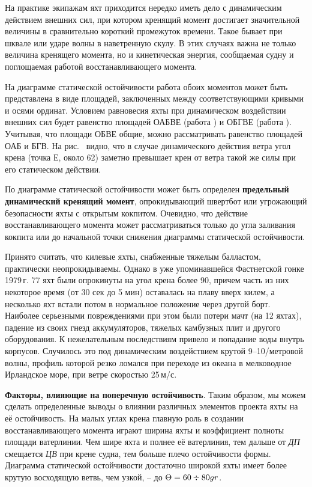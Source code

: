 На практике экипажам яхт приходится нередко иметь дело с динамическим действием внешних сил, при котором кренящий момент достигает значительной величины в сравнительно короткий промежуток времени. Такое бывает при шквале или ударе волны в наветренную скулу. В этих случаях важна не только величина кренящего момента, но и кинетическая энергия, сообщаемая судну и поглощаемая работой восстанавливающего момента. 

На диаграмме статической остойчивости работа обоих моментов может быть представлена в виде площадей, заключенных между соответствующими кривыми и осями ординат. Условием равновесия яхты при динамическом воздействии внешних сил будет равенство площадей ОАБВЕ (работа ) и ОБГВЕ (работа ). Учитывая, что площади ОБВЕ общие, можно рассматривать равенство площадей ОАБ и БГВ. На рис.~ видно, что в случае динамического действия ветра угол крена (точка Е, около 62\gr) заметно превышает крен от ветра такой же силы при его статическом действии. 

По диаграмме статической остойчивости может быть определен \textbf{предельный динамический кренящий момент}, опрокидывающий швертбот или угрожающий безопасности яхты с открытым кокпитом. Очевидно, что действие восстанавливающего момента может рассматриваться только до угла заливания кокпита или до начальной точки снижения диаграммы статической остойчивости.

Принято считать, что килевые яхты, снабженные тяжелым балластом, практически неопрокидываемы. Однако в уже упоминавшейся Фастнетской гонке 1979\,г. 77 яхт были опрокинуты на угол крена более 90\gr, причем часть из них некоторое время (от 30 сек до 5 мин) оставалась на плаву вверх килем, а несколько яхт встали потом в нормальное положение через другой борт. Наиболее серьезными повреждениями при этом были потери мачт (на 12 яхтах), падение из своих гнезд аккумуляторов, тяжелых камбузных плит и другого оборудования. К нежелательным последствиям привело и попадание воды внутрь корпусов. Случилось это под динамическим воздействием крутой 9--10\-/метровой волны, профиль которой резко ломался при переходе из океана в мелководное Ирландское море, при ветре скоростью 25\,м/с.

\textbf{Факторы, влияющие на поперечную остойчивость}. Таким образом, мы можем сделать определенные выводы о влиянии различных элементов проекта яхты на её остойчивость. На малых углах крена главную роль в создании восстанавливающего момента играют ширина яхты и коэффициент полноты площади ватерлинии. Чем шире яхта и полнее её ватерлиния, тем дальше от \textit{ДП} смещается \textit{ЦВ} при крене судна, тем больше плечо остойчивости формы. Диаграмма статической остойчивости достаточно широкой яхты имеет более крутую восходящую ветвь, чем узкой, \--- до $\Theta = 60 \div 80gr$. 


